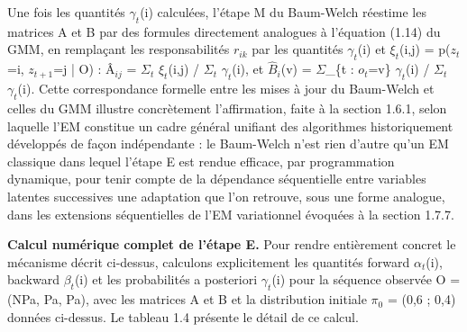 Une fois les quantités $\gamma _{t}$(i) calculées, l'étape M du Baum-Welch réestime les matrices A et B par des formules directement analogues à l'équation (1.14) du GMM, en remplaçant les responsabilités $r_{ik}$ par les quantités $\gamma _{t}$(i) et $\xi _{t}$(i,j) = p($z_{t}$=i, $z_{t+1}$=j | O) : Â$_{ij}$ = $\Sigma _{t}$ $\xi _{t}$(i,j) / $\Sigma _{t}$ $\gamma _{t}$(i), et $\hat{B}$$_{i}$(v) = $\Sigma $\_\{t : $o_{t}$=v\} $\gamma _{t}$(i) / $\Sigma _{t}$ $\gamma _{t}$(i). Cette correspondance formelle entre les mises à jour du Baum-Welch et celles du GMM illustre concrètement l'affirmation, faite à la section 1.6.1, selon laquelle l'EM constitue un cadre général unifiant des algorithmes historiquement développés de façon indépendante : le Baum-Welch n'est rien d'autre qu'un EM classique dans lequel l'étape E est rendue efficace, par programmation dynamique, pour tenir compte de la dépendance séquentielle entre variables latentes successives  une adaptation que l'on retrouve, sous une forme analogue, dans les extensions séquentielles de l'EM variationnel évoquées à la section 1.7.7.

\textbf{Calcul numérique complet de l'étape E. }Pour rendre entièrement concret le mécanisme décrit ci-dessus, calculons explicitement les quantités forward $\alpha _{t}$(i), backward $\beta _{t}$(i) et les probabilités a posteriori $\gamma _{t}$(i) pour la séquence observée O = (NPa, Pa, Pa), avec les matrices A et B et la distribution initiale $\pi _{0}$ = (0,6 ; 0,4) données ci-dessus. Le tableau 1.4 présente le détail de ce calcul.


